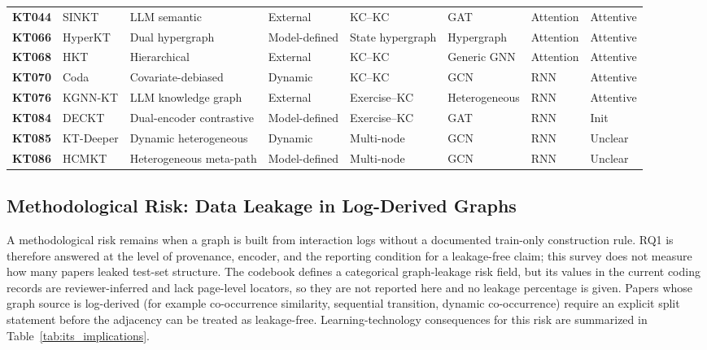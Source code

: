 \documentclass[lettersize,journal]{IEEEtran}
\begin{document}
\begin{table}[t]
\begin{tabular}{@{}ll>{\raggedright\arraybackslash}p{2.15cm}l>{\raggedright\arraybackslash}p{1.55cm}lll@{}}
\textbf{KT044} & SINKT \cite{KT044_SINKT_2024} & LLM semantic & External & KC--KC & GAT & Attention & Attentive \\
\textbf{KT066} & HyperKT \cite{KT066_HyperKT_2025} & Dual hypergraph & Model-defined & State hypergraph & Hypergraph & Attention & Attentive \\
\textbf{KT068} & HKT \cite{KT068_HKT_2025} & Hierarchical & External & KC--KC & Generic GNN & Attention & Attentive \\
\textbf{KT070} & Coda \cite{KT070_Coda_2025} & Covariate-debiased & Dynamic & KC--KC & GCN & RNN & Attentive \\
\textbf{KT076} & KGNN-KT \cite{KT076_KGNNKT_2025} & LLM knowledge graph & External & Exercise--KC & Heterogeneous & RNN & Attentive \\
\textbf{KT084} & DECKT \cite{DECKT_2025} & Dual-encoder contrastive & Model-defined & Exercise--KC & GAT & RNN & Init \\
\textbf{KT085} & KT-Deeper \cite{Han_KTDeeper_2024} & Dynamic heterogeneous & Dynamic & Multi-node & GCN & RNN & Unclear \\
\textbf{KT086} & HCMKT \cite{HCMKT_2026} & Heterogeneous meta-path & Model-defined & Multi-node & GCN & RNN & Unclear \\
\bottomrule
\end{tabular}
\end{table}

\subsection{Methodological Risk: Data Leakage in Log-Derived Graphs}
A methodological risk remains when a graph is built from interaction logs without a documented train-only construction rule. RQ1 is therefore answered at the level of provenance, encoder, and the reporting condition for a leakage-free claim; this survey does not measure how many papers leaked test-set structure. The codebook defines a categorical graph-leakage risk field, but its values in the current coding records are reviewer-inferred and lack page-level locators, so they are not reported here and no leakage percentage is given. Papers whose graph source is log-derived (for example co-occurrence similarity, sequential transition, dynamic co-occurrence) require an explicit split statement before the adjacency can be treated as leakage-free. Learning-technology consequences for this risk are summarized in Table~\ref{tab:its_implications}.
\end{document}

